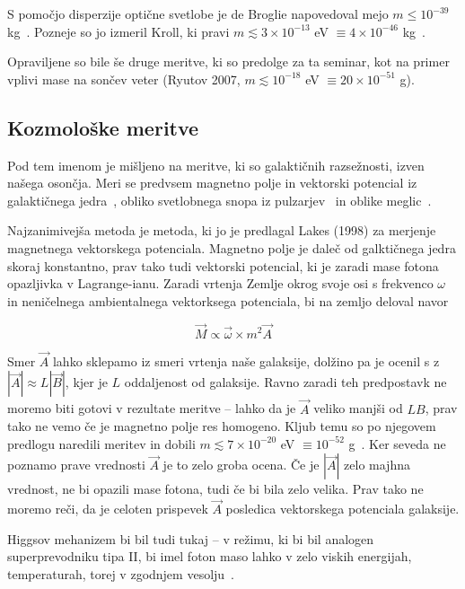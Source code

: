 \documentclass[a4paper, twocolumn, titlepage]{article}
\newcommand{\w}{
	\ensuremath{\omega}
}
\begin{document}
S pomočjo disperzije optične svetlobe je de Broglie napovedoval mejo $m \leq 10^{-39}$ kg~\cite{nieto2}. Pozneje so jo izmeril Kroll,
ki pravi $m \lesssim 3 \times 10^{-13}$ eV $\equiv 4 \times 10^{-46}$ kg~\cite{nieto2}.

Opraviljene so bile še druge meritve, ki so predolge za ta seminar, kot na primer vplivi mase na sončev veter (Ryutov 2007,
$m \lesssim 10^{-18}$ eV $\equiv 20\times10^{-51}$ g).

\subsection{Kozmološke meritve}

Pod tem imenom je mišljeno na meritve, ki so galaktičnih razsežnosti, izven našega osončja. Meri se predvsem magnetno polje in
vektorski potencial
iz galaktičnega jedra~\cite{over}, obliko svetlobnega snopa iz pulzarjev~\cite{nieto1} in oblike meglic~\cite{nieto2}.

Najzanimivejša metoda je metoda, ki jo je predlagal
Lakes (1998) za merjenje magnetnega vektorskega potenciala. Magnetno polje je daleč od galktičnega jedra
skoraj konstantno, prav tako tudi vektorski potencial, ki je zaradi mase fotona opazljivka v Lagrange-ianu. Zaradi vrtenja Zemlje okrog
svoje osi s frekvenco $\w$ in neničelnega ambientalnega vektorksega potenciala, bi na zemljo deloval navor

\[
	\vec{M} \propto \vec{\w} \times m^2\vec{A}
\]

Smer $\vec{A}$ lahko sklepamo iz smeri vrtenja naše galaksije, dolžino pa je ocenil s z $|\vec{A}| \approx L|\vec{B}|$, kjer je $L$ oddaljenost
od galaksije. Ravno zaradi teh predpostavk ne moremo biti gotovi v rezultate meritve -- lahko da je $\vec{A}$ veliko manjši od $LB$, prav
tako ne vemo če je magnetno polje res homogeno. Kljub temu so po njegovem predlogu naredili meritev in dobili
$m \lesssim 7 \times 10^{-20}$ eV $\equiv 10^{-52}$ g~\cite{nieto2}. Ker seveda ne poznamo prave vrednosti $\vec{A}$ je to zelo groba ocena.
Če je $|\vec{A}|$ zelo majhna vrednost, ne bi opazili mase fotona, tudi če bi bila zelo velika. Prav tako ne moremo reči, da je celoten
prispevek $\vec{A}$ posledica vektorskega potenciala galaksije.

Higgsov mehanizem bi bil tudi tukaj -- v režimu, ki bi bil analogen superprevodniku tipa II, bi imel foton maso lahko v zelo viskih energijah,
temperaturah, torej v zgodnjem vesolju~\cite{nieto2}.
\end{document}
